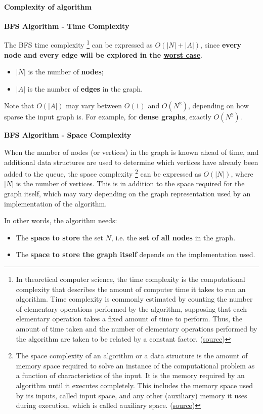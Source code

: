 \newpage

\paragraph{Complexity of algorithm}

\begin{flushleft}
    \textcolor{Green3}{ \textbf{BFS Algorithm - Time Complexity}}
\end{flushleft}
The BFS time complexity%
\footnote{In theoretical computer science, the time complexity is the computational complexity that describes the amount of computer time it takes to run an algorithm. Time complexity is commonly estimated by counting the number of elementary operations performed by the algorithm, supposing that each elementary operation takes a fixed amount of time to perform. Thus, the amount of time taken and the number of elementary operations performed by the algorithm are taken to be related by a constant factor. (\href{https://en.wikipedia.org/wiki/Time_complexity}{source})}
can be expressed as $O\left(\left|N\right|+\left|A\right|\right)$, since \textbf{every node and every edge will be explored in the \underline{worst case}}.
\begin{itemize}
    \item $\left|N\right|$ is the number of \textbf{nodes};
    \item $\left|A\right|$ is the number of \textbf{edges} in the graph.
\end{itemize}
Note that $O\left(\left|A\right|\right)$ may vary between $O\left(1\right)$ and $O\left(N^{2}\right)$, depending on how sparse the input graph is. For example, for \textbf{dense graphs}, exactly $O\left(N^{2}\right)$.

\highspace
\begin{flushleft}
    \textcolor{Green3}{ \textbf{BFS Algorithm - Space Complexity}}
\end{flushleft}
When the number of nodes (or vertices) in the graph is known ahead of time, and additional data structures are used to determine which vertices have already been added to the queue, the space complexity%
\footnote{The space complexity of an algorithm or a data structure is the amount of memory space required to solve an instance of the computational problem as a function of characteristics of the input. It is the memory required by an algorithm until it executes completely. This includes the memory space used by its inputs, called input space, and any other (auxiliary) memory it uses during execution, which is called auxiliary space. (\href{https://en.wikipedia.org/wiki/Space_complexity}{source})}
can be expressed as $O\left(\left|N\right|\right)$, where $\left|N\right|$ is the number of vertices. This is in addition to the space required for the graph itself, which may vary depending on the graph representation used by an implementation of the algorithm.

\highspace
In other words, the algorithm needs:
\begin{itemize}
    \item The \textbf{space to store} the set $N$, i.e. the \textbf{set of all nodes} in the graph.
    \item The \textbf{space to store the graph itself} depends on the implementation used.
\end{itemize}